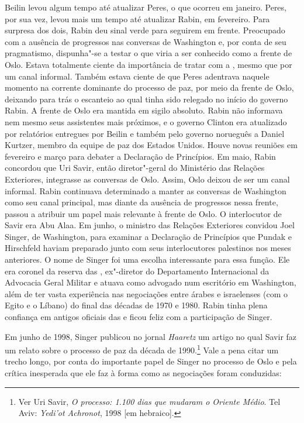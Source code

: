 Beilin levou algum tempo até atualizar Peres, o que ocorreu em janeiro.
Peres, por sua vez, levou mais um tempo até atualizar Rabin, em
fevereiro. Para surpresa dos dois, Rabin deu sinal verde para seguirem
em frente. Preocupado com a ausência de progressos nas conversas de
Washington e, por conta de seu pragmatismo, dispunha"-se a testar o que
viria a ser conhecido como a frente de Oslo. Estava totalmente ciente da
importância de tratar com a , mesmo que por um canal informal. Também
estava ciente de que Peres adentrava naquele momento na corrente
dominante do processo de paz, por meio da frente de Oslo, deixando para
trás o escanteio ao qual tinha sido relegado no início do governo Rabin.
A frente de Oslo era mantida em sigilo absoluto. Rabin não informava nem
mesmo seus assistentes mais próximos, e o governo Clinton era atualizado
por relatórios entregues por Beilin e também pelo governo norueguês a
Daniel Kurtzer, membro da equipe de paz dos Estados Unidos. Houve novas
reuniões em fevereiro e março para debater a Declaração de Princípios.
Em maio, Rabin concordou que Uri Savir, então diretor"-geral do
Ministério das Relações Exteriores, integrasse as conversas de Oslo.
Assim, Oslo deixou de ser um canal informal. Rabin continuava
determinado a manter as conversas de Washington como seu canal
principal, mas diante da ausência de progressos nessa frente, passou a
atribuir um papel mais relevante à frente de Oslo. O interlocutor de
Savir era Abu Alaa. Em junho, o ministro das Relações Exteriores
convidou Joel Singer, de Washington, para examinar a Declaração de
Princípios que Pundak e Hirschfeld haviam preparado junto com seus
interlocutores palestinos nos meses anteriores. O nome de Singer foi uma
escolha interessante para essa função. Ele era coronel da reserva das
, ex"-diretor do Departamento Internacional da Advocacia Geral Militar
e atuava como advogado num escritório em Washington, além
de ter vasta experiência nas negociações entre árabes e israelenses (com
o Egito e o Líbano) do final das décadas de 1970 e 1980. Rabin tinha
plena confiança em antigos oficiais das  e ficou feliz com a
participação de Singer.

Em junho de 1998, Singer publicou no jornal \emph{Haaretz} um artigo no
qual Savir faz um relato sobre o processo de paz da década de
1990.\footnote{Ver Uri Savir, \emph{O processo: 1.100 dias que mudaram o Oriente Médio}.
Tel Aviv: \emph{Yedi'ot Achronot}, 1998 {[}em hebraico{]}.} Vale a pena
citar um trecho longo, por conta do importante papel de Singer no
processo de Oslo e pela crítica inesperada que ele faz à forma como as
negociações foram conduzidas:

